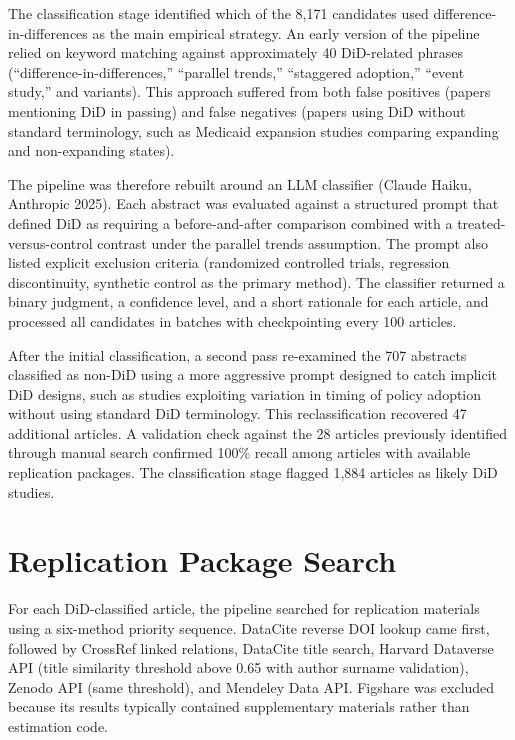 The classification stage identified which of the 8,171 candidates used difference-in-differences as the main empirical strategy. An early version of the pipeline relied on keyword matching against approximately 40 DiD-related phrases (``difference-in-differences,'' ``parallel trends,'' ``staggered adoption,'' ``event study,'' and variants). This approach suffered from both false positives (papers mentioning DiD in passing) and false negatives (papers using DiD without standard terminology, such as Medicaid expansion studies comparing expanding and non-expanding states).

The pipeline was therefore rebuilt around an LLM classifier (Claude Haiku, Anthropic 2025). Each abstract was evaluated against a structured prompt that defined DiD as requiring a before-and-after comparison combined with a treated-versus-control contrast under the parallel trends assumption. The prompt also listed explicit exclusion criteria (randomized controlled trials, regression discontinuity, synthetic control as the primary method). The classifier returned a binary judgment, a confidence level, and a short rationale for each article, and processed all candidates in batches with checkpointing every 100 articles.

After the initial classification, a second pass re-examined the 707 abstracts classified as non-DiD using a more aggressive prompt designed to catch implicit DiD designs, such as studies exploiting variation in timing of policy adoption without using standard DiD terminology. This reclassification recovered 47 additional articles. A validation check against the 28 articles previously identified through manual search confirmed 100\% recall among articles with available replication packages. The classification stage flagged 1,884 articles as likely DiD studies.

\section{Replication Package Search}

For each DiD-classified article, the pipeline searched for replication materials using a six-method priority sequence. DataCite reverse DOI lookup came first, followed by CrossRef linked relations, DataCite title search, Harvard Dataverse API (title similarity threshold above 0.65 with author surname validation), Zenodo API (same threshold), and Mendeley Data API. Figshare was excluded because its results typically contained supplementary materials rather than estimation code.

